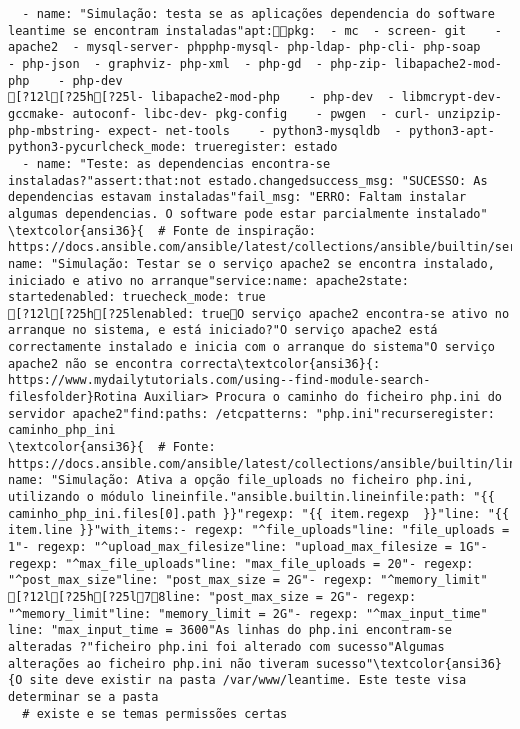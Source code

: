 \documentclass{scrartcl}
\begin{document}
\begin{Verbatim}
  - name: "Simulação: testa se as aplicações dependencia do software leantime se encontram instaladas"apt:pkg:  - mc  - screen- git    - apache2  - mysql-server- phpphp-mysql- php-ldap- php-cli- php-soap    - php-json  - graphviz- php-xml  - php-gd  - php-zip- libapache2-mod-php    - php-dev
[?12l[?25h[?25l- libapache2-mod-php    - php-dev  - libmcrypt-dev- gccmake- autoconf- libc-dev- pkg-config    - pwgen  - curl- unzipzip- php-mbstring- expect- net-tools    - python3-mysqldb  - python3-apt- python3-pycurlcheck_mode: trueregister: estado
  - name: "Teste: as dependencias encontra-se instaladas?"assert:that:not estado.changedsuccess_msg: "SUCESSO: As dependencias estavam instaladas"fail_msg: "ERRO: Faltam instalar algumas dependencias. O software pode estar parcialmente instalado"
\textcolor{ansi36}{  # Fonte de inspiração: https://docs.ansible.com/ansible/latest/collections/ansible/builtin/service_module.html}- name: "Simulação: Testar se o serviço apache2 se encontra instalado, iniciado e ativo no arranque"service:name: apache2state: startedenabled: truecheck_mode: true
[?12l[?25h[?25lenabled: trueO serviço apache2 encontra-se ativo no arranque no sistema, e está iniciado?"O serviço apache2 está correctamente instalado e inicia com o arranque do sistema"O serviço apache2 não se encontra correcta\textcolor{ansi36}{: https://www.mydailytutorials.com/using--find-module-search-filesfolder}Rotina Auxiliar> Procura o caminho do ficheiro php.ini do servidor apache2"find:paths: /etcpatterns: "php.ini"recurseregister: caminho_php_ini
\textcolor{ansi36}{  # Fonte: https://docs.ansible.com/ansible/latest/collections/ansible/builtin/lineinfile_module.html}- name: "Simulação: Ativa a opção file_uploads no ficheiro php.ini, utilizando o módulo lineinfile."ansible.builtin.lineinfile:path: "{{ caminho_php_ini.files[0].path }}"regexp: "{{ item.regexp  }}"line: "{{ item.line }}"with_items:- regexp: "^file_uploads"line: "file_uploads = 1"- regexp: "^upload_max_filesize"line: "upload_max_filesize = 1G"- regexp: "^max_file_uploads"line: "max_file_uploads = 20"- regexp: "^post_max_size"line: "post_max_size = 2G"- regexp: "^memory_limit"
[?12l[?25h[?25l78line: "post_max_size = 2G"- regexp: "^memory_limit"line: "memory_limit = 2G"- regexp: "^max_input_time"  line: "max_input_time = 3600"As linhas do php.ini encontram-se alteradas ?"ficheiro php.ini foi alterado com sucesso"Algumas alterações ao ficheiro php.ini não tiveram sucesso"\textcolor{ansi36}{O site deve existir na pasta /var/www/leantime. Este teste visa determinar se a pasta
  # existe e se temas permissões certas

\end{Verbatim}
\end{document}
